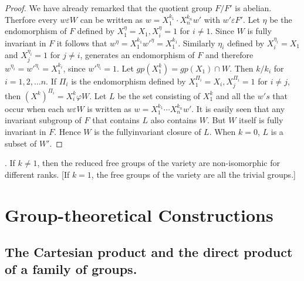 \begin{proof}
  We have already remarked that the quotient group $F/F'$ is
  abelian. Therfore every $w \varepsilon W$ can be written as
  $w=X^{k_1}_1 \cdot X^{k_n}_n w'$ with $w' \varepsilon F'$. Let
  $\eta$ be the endomorphism of $F$ defined by $X^\eta_1 = X_1,
  X^\eta_i = 1$ for $i \neq 1$. Since $W$ is fully invariant in $F$ it
  follows that $w^\eta = X^{k_1}_1 w'^{\eta}=X^{k_1}_1$. Similarly
  $\eta_i$ defined by $X^{\eta_i}_i = X_1$ and $X^{\eta_i}_j = 1$ for
  $j \neq i$, generates an endomorphism of $F$ and therefore
  $w^{\eta_i}=w'^{\eta_i}= X^{k_i}_1$, since $w'^{\eta_i}=1$. Let
  $gp(X^k_1) = gp(X_1) \cap W$. Then $k/k_i$ for $i=1,2,\ldots n$. If
  $\Pi_i$ is the endomorphism defined by $X^{\Pi_i}_1 = X_i,
  X^{\Pi_i}_j = 1$ for $i \neq j$, then $(X^k)^{\Pi_i} = X^k_i \varphi
  W$. Let $L$ be the set consisting of $X^k_1$ and all the $w's$ that
  occur when each $w \varepsilon W$ is written as $w = X^{k_1}_1
  \cdots X^{k_n}_n w'$. It is easily seen that any invariant subgroup
  of $F$ that contains $L$ also contains $W$. But $W$ itself is fully
  invariant in $F$. Hence $W$ is the fullyinvariant closure of
  $L$. When $k=0$, $L$ is a subset of $W'$. 
\end{proof}  
  
\begin{corollary}[B.M. Neumann, $1937^1$]. 
  If $k \neq 1$, then the reduced free groups of the variety are
  non-isomorphic for different ranks. [If $k=1$, the free groups of
    the variety are all the trivial groups.] 
\end{corollary}  

\chapter{Group-theoretical Constructions}%

\section{The Cartesian product and the direct product of a family of
  groups.}%

